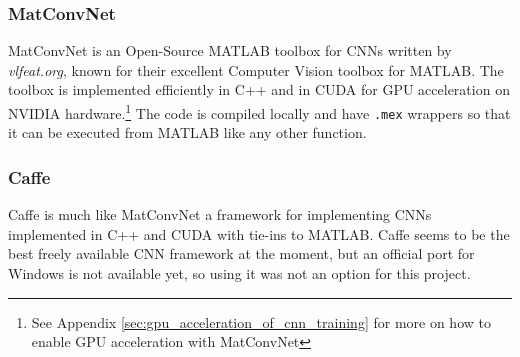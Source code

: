 \documentclass[Main]{subfiles}
\begin{document}

		\subsubsection{MatConvNet} %
			\label{ssub:matconvnet}
			MatConvNet \cite{Lenc2014} is an Open-Source MATLAB toolbox for CNNs written by \emph{vlfeat.org}, known for their excellent Computer Vision toolbox for MATLAB.
			The toolbox is implemented efficiently in C++ and in CUDA for GPU acceleration on NVIDIA hardware.\footnote{
				See Appendix \ref{sec:gpu_acceleration_of_cnn_training} for more on how to enable GPU acceleration with MatConvNet
				} 
			The code is compiled locally and have \texttt{.mex} wrappers so that it can be executed from MATLAB like any other function.
		
		
		\subsubsection{Caffe} %
			\label{ssub:caffe}
			Caffe \cite{jia2014caffe} is much like MatConvNet a framework for implementing CNNs implemented in C++ and CUDA with tie-ins to MATLAB.
			Caffe seems to be the best freely available CNN framework at the moment, but an official port for Windows is not available yet, so using it was not an option for this project.








	
\end{document}
